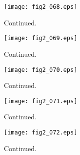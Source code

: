\documentclass[preprint]{aastex}
\begin{document}
\setcounter{figure}{1}
\begin{figure}[t]
\centering
\texttt{[image: fig2\_068.eps]}
\caption{
Continued. 
}
\label{Fig2}
\end{figure}
\clearpage



\setcounter{figure}{1}
\begin{figure}[t]
\centering
\texttt{[image: fig2\_069.eps]}
\caption{
Continued. 
}
\label{Fig2}
\end{figure}
\clearpage



\setcounter{figure}{1}
\begin{figure}[t]
\centering
\texttt{[image: fig2\_070.eps]}
\caption{
Continued. 
}
\label{Fig2}
\end{figure}
\clearpage



\setcounter{figure}{1}
\begin{figure}[t]
\centering
\texttt{[image: fig2\_071.eps]}
\caption{
Continued. 
}
\label{Fig2}
\end{figure}
\clearpage



\setcounter{figure}{1}
\begin{figure}[t]
\centering
\texttt{[image: fig2\_072.eps]}
\caption{
Continued. 
}
\label{Fig2}
\end{figure}
\clearpage
\end{document}
